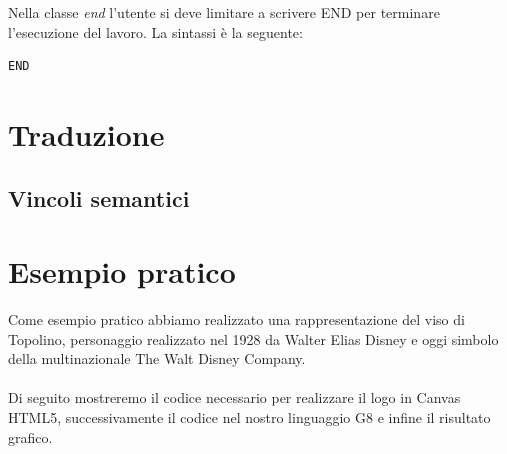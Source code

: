 \documentclass[a4paper]{article}
\begin{document}
Nella classe \textit{end} l’utente si deve limitare a scrivere END per terminare l’esecuzione del lavoro. La sintassi è la seguente:
\begin{verbatim}
END
\end{verbatim}

\newpage

\section{Traduzione}

\subsection{Vincoli semantici}

\newpage

\section{Esempio pratico}
Come esempio pratico abbiamo realizzato una rappresentazione del viso di Topolino, personaggio realizzato nel 1928 da Walter Elias Disney e oggi simbolo della multinazionale The Walt Disney Company.
\\
\\
Di seguito mostreremo il codice necessario per realizzare il logo in Canvas HTML5, successivamente il codice nel nostro linguaggio G8 e infine il risultato grafico.
\end{document}
